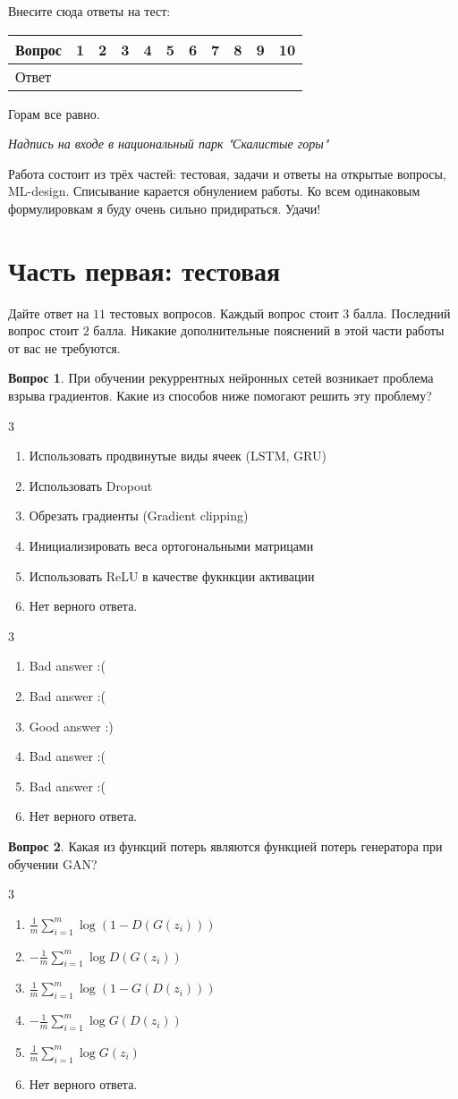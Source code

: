 \documentclass[12pt]{article}
\def \putyourname{\fbox{
    \begin{minipage}{42em}
      Фамилия, имя, номер группы:\vspace*{3ex}\par
      \noindent\dotfill\vspace{2mm}
    \end{minipage}
  }
}
\def \checktable{

  \vspace{5pt}
  Табличка для проверяющих работу:

\vspace{5pt}

  \begin{tabular}{|m{2cm}|m{1cm}|m{1cm}|m{1cm}|m{1cm}|m{1cm}|m{2cm}|}
\toprule
    Тест & 1 &  2 & 3 & 4 & 5 & Итого \\
\midrule
    &  &  & & & & \\
    &  &  & & & & \\
 \bottomrule
\end{tabular}
}
\def \testtable{

\vspace{5pt}
  Внесите сюда ответы на тест:

\vspace{5pt}

\begin{tabular}{|m{2cm}|m{0.6cm}|m{0.6cm}|m{0.6cm}|m{0.6cm}|m{0.6cm}|m{0.6cm}|m{0.6cm}|m{0.6cm}|m{0.6cm}|m{0.6cm}|}
\toprule
    Вопрос & 1 &  2 & 3 & 4 & 5 & 6 & 7 & 8 & 9 & 10 \\
\midrule
    Ответ &  &  & & & & & & & & \\
 \bottomrule
\end{tabular}
}
\newenvironment{answerlist}[1][3]{
\begin{multicols}{#1}

\begin{enumerate}[label=\fbox{\emph{\Alph*}},ref=\emph{\alph*}]
}
{
\item Нет верного ответа.
\end{enumerate}
\end{multicols}
}
\theoremstyle{definition}
\newtheorem{question}{Вопрос}
\begin{document}
\putyourname

\testtable



\epigraph{Горам все равно.}{\textit{Надпись на входе в национальный парк "Скалистые горы" }}

Работа состоит из трёх частей: тестовая, задачи и ответы на открытые вопросы, ML-design. Списывание карается обнулением работы. Ко всем одинаковым формулировкам я буду очень сильно придираться. Удачи!


\section*{Часть первая: тестовая} 

Дайте ответ на $11$ тестовых вопросов. Каждый вопрос стоит $3$ балла. Последний вопрос стоит $2$ балла. Никакие дополнительные пояснений в этой части работы от вас не требуются.

\begin{question}
При обучении рекуррентных нейронных сетей возникает проблема взрыва градиентов. Какие из способов ниже помогают решить эту проблему? 
\begin{answerlist}
  \item Использовать продвинутые виды ячеек (LSTM, GRU)
  \item Использовать Dropout
  \item Обрезать градиенты (Gradient clipping)
  \item Инициализировать веса ортогональными матрицами
  \item Использовать ReLU в качестве фукнкции активации
\end{answerlist}
\end{question}

\begin{solution}
\begin{answerlist}
  \item Bad answer :(
  \item Bad answer :(
  \item Good answer :)
  \item Bad answer :(
  \item Bad answer :(
\end{answerlist}
\end{solution}


\begin{question}
Какая из функций потерь являются функцией потерь генератора при обучении GAN?
\begin{answerlist}
  \item  $\frac{1}{m} \sum_{i=1}^m \log (1 - D(G(z_i)))$
  \item  $-\frac{1}{m} \sum_{i=1}^m \log D(G(z_i))$
  \item  $\frac{1}{m} \sum_{i=1}^m \log (1 - G(D(z_i)))$
  \item  $-\frac{1}{m} \sum_{i=1}^m \log G(D(z_i))$
  \item  $\frac{1}{m} \sum_{i=1}^m \log G(z_i)$
\end{answerlist}
\end{question}
\end{document}
